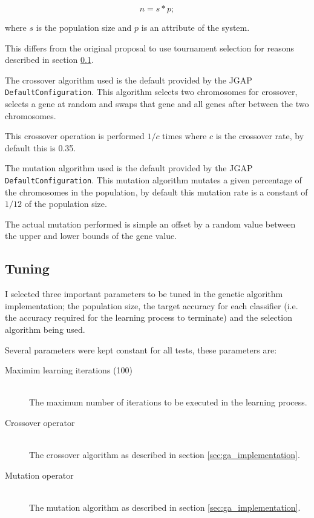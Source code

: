 \documentclass[a4paper]{article}
\begin{document}
\[
  n = s * p;
\]

where $s$ is the population size and $p$ is an attribute of the system.

This differs from the original proposal to use tournament selection for reasons
described in section \ref{sec:ga_tuning}.

The crossover algorithm used is the default provided by the JGAP
\texttt{DefaultConfiguration}. This algorithm selects two chromosomes for
crossover, selects a gene at random and swaps that gene and all genes after
between the two chromosomes.

This crossover operation is performed $1/c$ times where $c$ is the crossover
rate, by default this is 0.35.

The mutation algorithm used is the default provided by the JGAP
\texttt{DefaultConfiguration}. This mutation algorithm mutates a given
percentage of the chromosomes in the population, by default this mutation rate
is a constant of $1/12$ of the population size.

The actual mutation performed is simple an offset by a random value between the
upper and lower bounds of the gene value.

\subsection{Tuning}
\label{sec:ga_tuning}

I selected three important parameters to be tuned in the genetic algorithm
implementation; the population size, the target accuracy for each classifier
(i.e. the accuracy required for the learning process to terminate) and the
selection algorithm being used.

Several parameters were kept constant for all tests, these parameters are:

\begin{description}
  \item[Maximim learning iterations (100)] \hfill \\
    The maximum number of iterations to be executed in the learning process.
  \item[Crossover operator] \hfill \\
    The crossover algorithm as described in section \ref{sec:ga_implementation}.
  \item[Mutation operator] \hfill \\
    The mutation algorithm as described in section \ref{sec:ga_implementation}.
\end{description}
\end{document}
